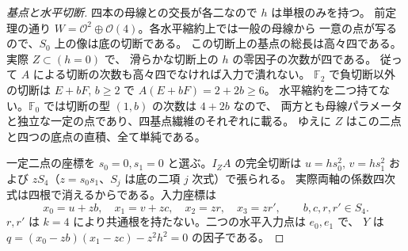 \begin{proof}[基点と水平切断]
四本の母線との交長が各二なので $h$ は単根のみを持つ。
前定理の通り $W=\mathcal O^2\oplus\mathcal O(4)$。各水平縮約上では一般の母線から
一意の点が写るので、$S_0$ 上の像は底の切断である。
この切断上の基点の総長は高々四である。実際 $Z\subset(h=0)$ で、
滑らかな切断上の $h$ の零因子の次数が四である。
従って $A$ による切断の次数も高々四でなければ入力で潰れない。
$\mathbb F_2$ で負切断以外の切断は $E+bF$, $b\ge2$ で $A(E+bF)=2+2b\ge6$。
水平縮約を二つ持てない。$\mathbb F_0$ では切断の型 $(1,b)$ の次数は $4+2b$ なので、
両方とも母線パラメータと独立な一定の点であり、四基点繊維のそれぞれに載る。
ゆえに $Z$ はこの二点と四つの底点の直積、全て単純である。

一定二点の座標を $s_0=0,s_1=0$ と選ぶ。$I_Z A$ の完全切断は
$u=h s_0^2$, $v=h s_1^2$ および $z S_4$（$z=s_0s_1$、$S_j$ は底の二項 $j$ 次式）で張られる。
実際両軸の係数四次式は四根で消えるからである。入力座標は
\[
      x_0=u+z b,\quad x_1=v+z c,\quad x_2=z r,\quad x_3=z r',
      \qquad b,c,r,r'\in S_4 .
\]
$r,r'$ は $k=4$ により共通根を持たない。二つの水平入力点は $e_0,e_1$ で、
$Y$ は $q=(x_0-zb)(x_1-zc)-z^2h^2=0$ の因子である。
\end{proof}

